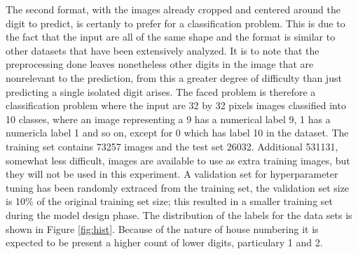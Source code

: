 \documentclass[12pt]{article}
\begin{document}
The second format, with the images already cropped and centered around the digit to predict, is certanly to prefer for a classification problem. This is due to the fact that the input are all of the same shape and the format is similar to other datasets that have been extensively analyzed. It is to note that the preprocessing done leaves nonetheless other digits in the image that are nonrelevant to the prediction, from this a greater degree of difficulty than just predicting a single isolated digit arises.
The faced problem is therefore a classification problem where the input are 32 by 32 pixels images classified into 10 classes, where an image representing a 9 has a numerical label 9, 1 has a numericla label 1 and so on, except for 0 which has label 10 in the dataset. The training set contains 73257 images and the test set 26032. Additional 531131, somewhat less difficult, images are available to use as extra training images, but they will not be used in this experiment. A validation set for hyperparameter tuning has been randomly extraced from the training set, the validation set size is 10\% of the original training set size; this resulted in a smaller training set during the model design phase.
The distribution of the labels for the data sets is shown in Figure \ref{fig:hist}. Because of the nature of house numbering it is expected to be present a higher count of lower digits, particulary 1 and 2.
\end{document}
